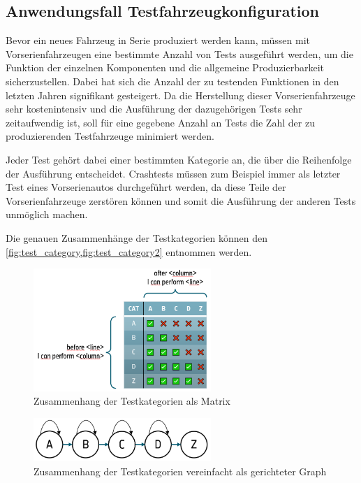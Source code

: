\subsection{Anwendungsfall Testfahrzeugkonfiguration}\label{subsec:anwendungsfall-testfahrzeugkonfiguration}

Bevor ein neues Fahrzeug in Serie produziert werden kann,
müssen mit Vorserienfahrzeugen eine bestimmte Anzahl von Tests ausgeführt werden,
um die Funktion der einzelnen Komponenten und die allgemeine Produzierbarkeit sicherzustellen.
Dabei hat sich die Anzahl der zu testenden Funktionen in den letzten Jahren signifikant gesteigert.
Da die Herstellung dieser Vorserienfahrzeuge sehr kostenintensiv und die Ausführung der dazugehörigen
Tests sehr zeitaufwendig ist, soll für eine gegebene Anzahl an Tests die Zahl der zu produzierenden
Testfahrzeuge minimiert werden.

Jeder Test gehört dabei einer bestimmten Kategorie an,
die über die Reihenfolge der Ausführung entscheidet.
Crashtests müssen zum Beispiel immer als letzter Test eines
Vorserienautos durchgeführt werden, da diese Teile der
Vorserienfahrzeuge zerstören können und somit die
Ausführung der anderen Tests unmöglich machen.

Die genauen Zusammenhänge der Testkategorien können den
\cref{fig:test_category,fig:test_category2} entnommen werden.

\begin{figure}[H]
    \centering
    \includegraphics[width=0.6\textwidth]{images/testfahrzeug_problem/Bench-QC_TVC_simplified_Matrix}
    \caption{Zusammenhang der Testkategorien als Matrix}
    \label{fig:test_category}
\end{figure}
\begin{figure}[H]
    \centering
    \includegraphics[width=0.6\textwidth]{images/testfahrzeug_problem/Bench-QC_TVC_simplified_dependencies}
    \caption{Zusammenhang der Testkategorien vereinfacht als gerichteter Graph}
    \label{fig:test_category2}
\end{figure}

